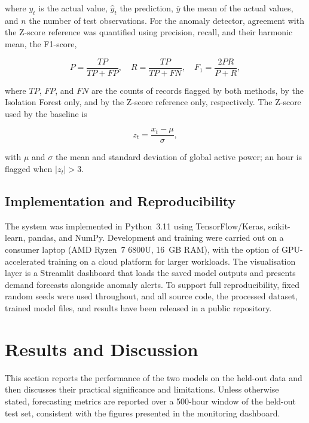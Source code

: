 \documentclass[conference]{IEEEtran}
\begin{document}
where $y_t$ is the actual value, $\hat{y}_t$ the prediction, $\bar{y}$ the mean
of the actual values, and $n$ the number of test observations. For the anomaly
detector, agreement with the Z-score reference was quantified using precision,
recall, and their harmonic mean, the F1-score,
 
\begin{equation}
P = \frac{TP}{TP+FP}, \quad
R = \frac{TP}{TP+FN}, \quad
F_1 = \frac{2PR}{P+R}, \label{eq:prf}
\end{equation}
 
where $TP$, $FP$, and $FN$ are the counts of records flagged by both methods, by
the Isolation Forest only, and by the Z-score reference only, respectively. The
Z-score used by the baseline is
 
\begin{equation}
z_t = \frac{x_t - \mu}{\sigma}, \label{eq:zscore}
\end{equation}
 
with $\mu$ and $\sigma$ the mean and standard deviation of global active power;
an hour is flagged when $|z_t| > 3$.
 
\subsection{Implementation and Reproducibility}
The system was implemented in Python~3.11 using TensorFlow/Keras, scikit-learn,
pandas, and NumPy. Development and training were carried out on a consumer laptop
(AMD Ryzen~7 6800U, 16~GB RAM), with the option of GPU-accelerated training on a
cloud platform for larger workloads. The visualisation layer is a Streamlit
dashboard that loads the saved model outputs and presents demand forecasts
alongside anomaly alerts. To support full reproducibility, fixed random seeds
were used throughout, and all source code, the processed dataset, trained model
files, and results have been released in a public repository.

\section{Results and Discussion}\label{sec:results}
This section reports the performance of the two models on the held-out data and
then discusses their practical significance and limitations. Unless otherwise
stated, forecasting metrics are reported over a 500-hour window of the held-out
test set, consistent with the figures presented in the monitoring dashboard.
 
\end{document}
